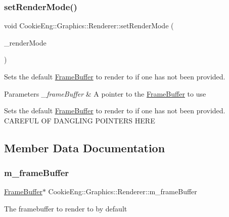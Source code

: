 \subsubsection{\texorpdfstring{set\+Render\+Mode()}{setRenderMode()}}
{\footnotesize\ttfamily void Cookie\+Eng\+::\+Graphics\+::\+Renderer\+::set\+Render\+Mode (\begin{DoxyParamCaption}\item[{Render\+Mode}]{\+\_\+render\+Mode }\end{DoxyParamCaption})\hspace{0.3cm}{\ttfamily [inline]}}



Sets the default \hyperlink{class_cookie_eng_1_1_graphics_1_1_frame_buffer}{Frame\+Buffer} to render to if one has not been provided. 


\begin{DoxyParams}{Parameters}
{\em \+\_\+frame\+Buffer} & A pointer to the \hyperlink{class_cookie_eng_1_1_graphics_1_1_frame_buffer}{Frame\+Buffer} to use\\
\hline
\end{DoxyParams}
Sets the default \hyperlink{class_cookie_eng_1_1_graphics_1_1_frame_buffer}{Frame\+Buffer} to render to if one has not been provided. C\+A\+R\+E\+F\+UL OF D\+A\+N\+G\+L\+I\+NG P\+O\+I\+N\+T\+E\+RS H\+E\+RE 

\subsection{Member Data Documentation}
\mbox{\label{class_cookie_eng_1_1_graphics_1_1_renderer_a64f992d6d2476fe2ea641f31a46f006e}} 
\subsubsection{\texorpdfstring{m\+\_\+frame\+Buffer}{m\_frameBuffer}}
{\footnotesize\ttfamily \hyperlink{class_cookie_eng_1_1_graphics_1_1_frame_buffer}{Frame\+Buffer}$\ast$ Cookie\+Eng\+::\+Graphics\+::\+Renderer\+::m\+\_\+frame\+Buffer\hspace{0.3cm}{\ttfamily [protected]}}

The framebuffer to render to by default \mbox{\label{class_cookie_eng_1_1_graphics_1_1_renderer_af4068b4414967468816ecea24ae30513}} 
